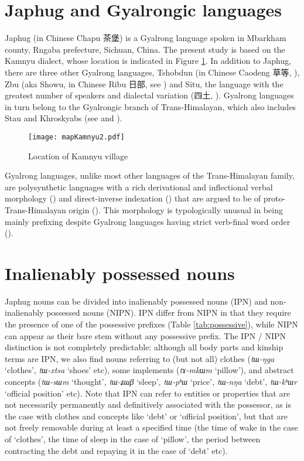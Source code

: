 \documentclass[oldfontcommands,oneside,a4paper,11pt]{article}
\newcommand{\ipa}[1]{{\phon\textit{#1}}} %
\newcommand{\zh}[1]{{\cn #1}}
\begin{document}
 \section{Japhug and Gyalrongic languages} 
Japhug (in Chinese Chapu \zh{茶堡}) is a Gyalrong language spoken in Mbarkham county, Rngaba prefecture, Sichuan, China. The present study is based on the Kamnyu dialect, whose location is indicated in Figure \ref{fig:kamnyu}. In addition to Japhug, there are three other Gyalrong languages, Tshobdun (in Chinese Caodeng \zh{草等}, \citealt{jackson03caodeng}), Zbu (aka Showu, in Chinese Ribu \zh{日部}, see \citealt{jackson04showu, gongxun14agreement}) and Situ, the language with the greatest number of speakers and dialectal variation (\zh{四土}, \citealt{linxr93jiarongen, huangsun02, prins11kyomkyo}). Gyalrong languages in turn belong to the Gyalrongic branch of Trans-Himalayan, which also includes Stau and Khroskyabs (see \citealt{jackson00puxi} and \citealt{lai15person}).

\begin{figure}[H]
\centering
\label{fig:kamnyu}
\caption{Location of Kamnyu village}
\texttt{[image: mapKamnyu2.pdf]}
\end{figure}

Gyalrong languages, unlike most other languages of the Trans-Himalayan family, are polysynthetic languages with a rich derivational and inflectional verbal morphology (\citealt{jacques12incorp, jackson14morpho}) and direct-inverse indexation (\citealt{delancey81direction, jackson02rentongdengdi, jacques10inverse, gongxun14agreement}) that are argued to be of proto-Trans-Himalayan origin (\citealt{delancey10agreement, jacques12agreement}). This morphology is typologically unusual in being mainly prefixing despite Gyalrong languages having strict verb-final word order (\citealt{jacques13harmonization}).

 \section{Inalienably possessed nouns} 
Japhug nouns can be divided into inalienably possessed nouns (IPN) and non-inalienably possessed nouns (NIPN). IPN differ from NIPN in that they require the presence of one of the possessive prefixes (Table \ref{tab:possessive}), while NIPN can appear as their bare stem without any possessive prefix. The IPN / NIPN distinction is not completely predictable: although all body parts and kinship terms are IPN, we also find nouns referring to (but not all) clothes (\ipa{tɯ-ŋga} `clothes', \ipa{tɯ-xtsa} `shoes' etc), some implements (\ipa{tɤ-mkɯm} `pillow'), and abstract concepts (\ipa{tɯ-sɯm} `thought', \ipa{tɯ-ʑɯβ} `sleep', \ipa{tɯ-pʰɯ} `price', \ipa{tɯ-nŋa} `debt', \ipa{tɯ-kʰɯr} `official position' etc). Note that IPN can refer to entities or properties that are not necessarily permanently and definitively associated with the possessor, as is the case with clothes and concepts like `debt' or `official position', but that are not freely removable during at least a specified time (the time of wake in the case of `clothes', the time of sleep in the case of `pillow', the period between contracting the debt and repaying it in the case of `debt' etc).
\end{document}
